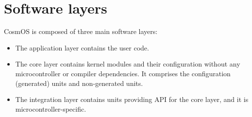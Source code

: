 \section{Software layers}
CosmOS is composed of three main software layers:
\begin{itemize}
\vspace{-0.2cm}\item The application layer contains the user code.
\vspace{-0.2cm}\item The core layer contains kernel modules and their configuration without any microcontroller or compiler dependencies. It comprises the configuration (generated) units and non-generated units.
\vspace{-0.2cm}\item The integration layer contains units providing \ac{API} for the core layer, and it is microcontroller-specific.
\end{itemize}


